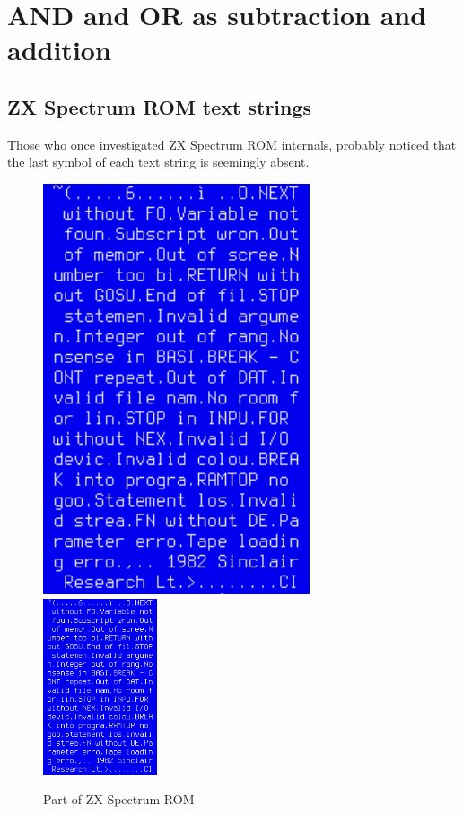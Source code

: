 \section{AND and OR as subtraction and addition}

\subsection{ZX Spectrum ROM text strings}
\label{ZX Spectrum}

Those who once investigated ZX Spectrum \ac{ROM} internals, probably noticed that the last symbol of each text string is seemingly
absent.

\begin{figure}[H]
\centering
\ifdefined\ebook
\includegraphics[width=0.7\textwidth]{fundamentals/zx_spectrum_ROM.png}
\else
\includegraphics[width=0.3\textwidth]{fundamentals/zx_spectrum_ROM.png}
\fi
\caption{Part of ZX Spectrum ROM}
\end{figure}

